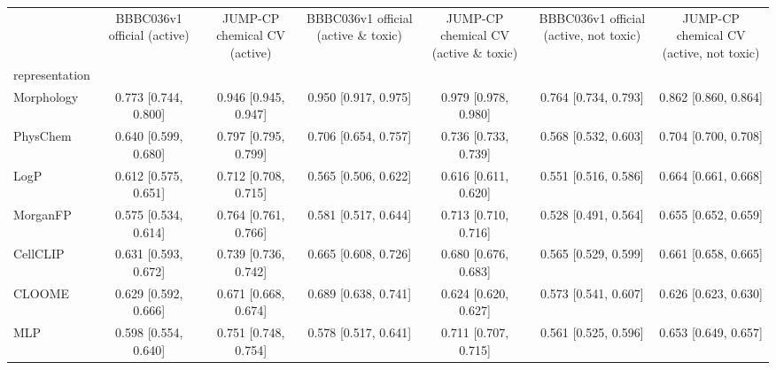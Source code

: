 \begin{tabular}{lcccccc}
\toprule
 & BBBC036v1 official (active) & JUMP-CP chemical CV (active) & BBBC036v1 official (active \& toxic) & JUMP-CP chemical CV (active \& toxic) & BBBC036v1 official (active, not toxic) & JUMP-CP chemical CV (active, not toxic) \\
representation &  &  &  &  &  &  \\
\midrule
Morphology & 0.773 [0.744, 0.800] & 0.946 [0.945, 0.947] & 0.950 [0.917, 0.975] & 0.979 [0.978, 0.980] & 0.764 [0.734, 0.793] & 0.862 [0.860, 0.864] \\
PhysChem & 0.640 [0.599, 0.680] & 0.797 [0.795, 0.799] & 0.706 [0.654, 0.757] & 0.736 [0.733, 0.739] & 0.568 [0.532, 0.603] & 0.704 [0.700, 0.708] \\
LogP & 0.612 [0.575, 0.651] & 0.712 [0.708, 0.715] & 0.565 [0.506, 0.622] & 0.616 [0.611, 0.620] & 0.551 [0.516, 0.586] & 0.664 [0.661, 0.668] \\
MorganFP & 0.575 [0.534, 0.614] & 0.764 [0.761, 0.766] & 0.581 [0.517, 0.644] & 0.713 [0.710, 0.716] & 0.528 [0.491, 0.564] & 0.655 [0.652, 0.659] \\
CellCLIP & 0.631 [0.593, 0.672] & 0.739 [0.736, 0.742] & 0.665 [0.608, 0.726] & 0.680 [0.676, 0.683] & 0.565 [0.529, 0.599] & 0.661 [0.658, 0.665] \\
CLOOME & 0.629 [0.592, 0.666] & 0.671 [0.668, 0.674] & 0.689 [0.638, 0.741] & 0.624 [0.620, 0.627] & 0.573 [0.541, 0.607] & 0.626 [0.623, 0.630] \\
MLP & 0.598 [0.554, 0.640] & 0.751 [0.748, 0.754] & 0.578 [0.517, 0.641] & 0.711 [0.707, 0.715] & 0.561 [0.525, 0.596] & 0.653 [0.649, 0.657] \\
\bottomrule
\end{tabular}
